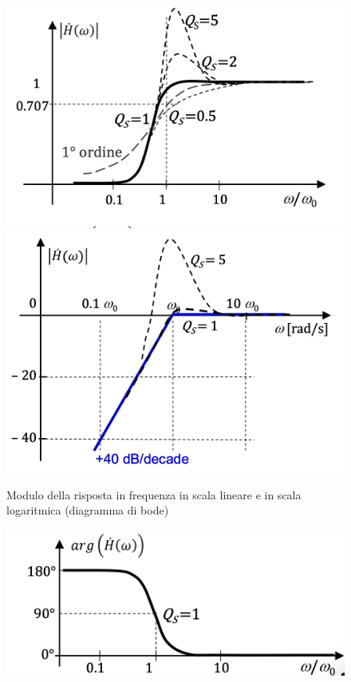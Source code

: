 \documentclass{article}
\theoremstyle{definition}
\begin{document}
\begin{itemize}
\begin{figure}[h]
	\centering 
	\includegraphics[scale=0.35]{immagini/paRLCg}
	\hfil 
	\includegraphics[scale=0.35]{immagini/paRLCbode}
	\caption{Modulo della risposta in frequenza in scala lineare e in scala logaritmica (diagramma di bode)}
\end{figure}
\begin{figure}[h]
	\centering 
	\includegraphics[scale=0.50]{immagini/paRLCg1}

\end{figure}
\end{itemize}
\end{document}
